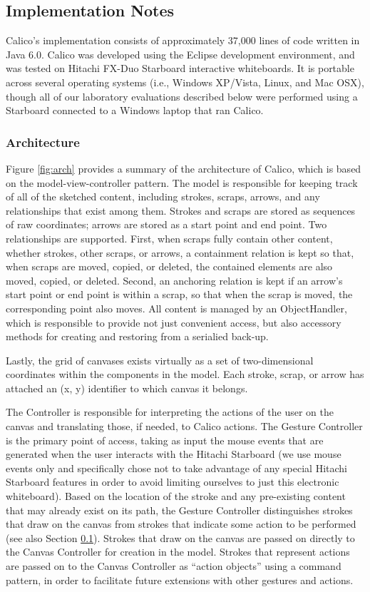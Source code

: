 \subsection {Implementation Notes}
\label{calico:5}

Calico's implementation consists of approximately 37,000 lines of code written in Java 6.0. Calico was developed using the Eclipse development environment, and was tested on Hitachi FX-Duo Starboard interactive whiteboards. It is portable across several operating systems (i.e., Windows XP/Vista, Linux, and Mac OSX), though all of our laboratory evaluations described below were performed using a Starboard connected to a Windows laptop that ran Calico. 

\subsubsection {Architecture}
\label{calico:5.1}

Figure \ref{fig:arch} provides a summary of the architecture of Calico, which is based on the model-view-controller pattern.  The model is responsible for keeping track of all of the sketched content, including strokes, scraps, arrows, and any relationships that exist among them.  Strokes and scraps are stored as sequences of raw coordinates; arrows are stored as a start point and end point.  Two relationships are supported. First, when scraps fully contain other content, whether strokes, other scraps, or arrows, a containment relation is kept so that, when scraps are moved, copied, or deleted, the contained elements are also moved, copied, or deleted. Second, an anchoring relation is kept if an arrow's start point or end point is within a scrap, so that when the scrap is moved, the corresponding point also moves.  All content is managed by an ObjectHandler, which is responsible to provide not just convenient access, but also accessory methods for creating and restoring from a serialied back-up. 

Lastly, the grid of canvases exists virtually as a set of two-dimensional coordinates within the components in the model.  Each stroke, scrap, or arrow has attached an (x, y) identifier to which canvas it belongs. 

The Controller is responsible for interpreting the actions of the user on the canvas and translating those, if needed, to Calico actions.  The Gesture Controller is the primary point of access, taking as input the mouse events that are generated when the user interacts with the Hitachi Starboard (we use mouse events only and specifically chose not to take advantage of any special Hitachi Starboard features in order to avoid limiting ourselves to just this electronic whiteboard).  Based on the location of the stroke and any pre-existing content that may already exist on its path, the Gesture Controller distinguishes strokes that draw on the canvas from strokes that indicate some action to be performed (see also Section \ref{calico:5}).  Strokes that draw on the canvas are passed on directly to the Canvas Controller for creation in the model.  Strokes that represent actions are passed on to the Canvas Controller as ``action objects'' using a command pattern, in order to facilitate future extensions with other gestures and actions.

